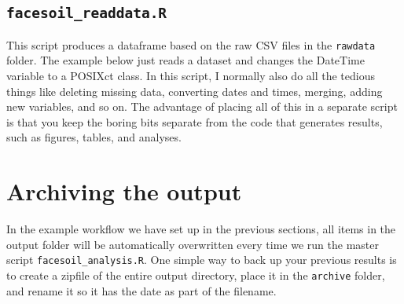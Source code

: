 \documentclass[]{book}
\newenvironment{Shaded}{\begin{snugshade}}{\end{snugshade}}
\newcommand{\CommentTok}[1]{\textcolor[rgb]{0.56,0.35,0.01}{\textit{#1}}}
\newcommand{\KeywordTok}[1]{\textcolor[rgb]{0.13,0.29,0.53}{\textbf{#1}}}
\newcommand{\NormalTok}[1]{#1}
\newcommand{\OperatorTok}[1]{\textcolor[rgb]{0.81,0.36,0.00}{\textbf{#1}}}
\newcommand{\StringTok}[1]{\textcolor[rgb]{0.31,0.60,0.02}{#1}}
\begin{document}
\hypertarget{facesoil_readdata.r}{%
\subsection{\texorpdfstring{\texttt{facesoil\_readdata.R}}{facesoil\_readdata.R}}\label{facesoil_readdata.r}}

This script produces a dataframe based on the raw CSV files in the \texttt{rawdata} folder. The example below just reads a dataset and changes the DateTime variable to a POSIXct class. In this script, I normally also do all the tedious things like deleting missing data, converting dates and times, merging, adding new variables, and so on. The advantage of placing all of this in a separate script is that you keep the boring bits separate from the code that generates results, such as figures, tables, and analyses.

\begin{Shaded}
\end{Shaded}

\hypertarget{archiving-the-output}{%
\section{Archiving the output}\label{archiving-the-output}}

In the example workflow we have set up in the previous sections, all items in the output folder will be automatically overwritten every time we run the master script \texttt{facesoil\_analysis.R}. One simple way to back up your previous results is to create a zipfile of the entire output directory, place it in the \texttt{archive} folder, and rename it so it has the date as part of the filename.
\end{document}
